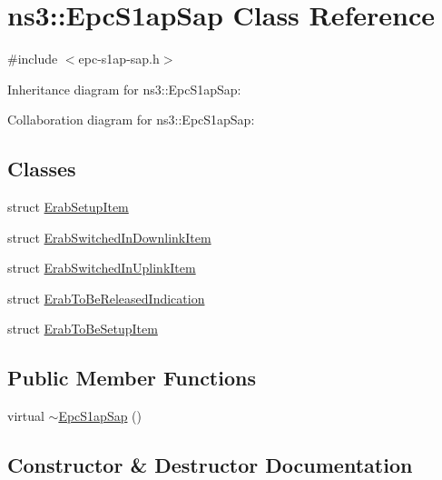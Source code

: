 \hypertarget{classns3_1_1EpcS1apSap}{}\section{ns3\+:\+:Epc\+S1ap\+Sap Class Reference}
\label{classns3_1_1EpcS1apSap}


{\ttfamily \#include $<$epc-\/s1ap-\/sap.\+h$>$}



Inheritance diagram for ns3\+:\+:Epc\+S1ap\+Sap\+:


Collaboration diagram for ns3\+:\+:Epc\+S1ap\+Sap\+:
\subsection*{Classes}
\begin{DoxyCompactItemize}
\item 
struct \hyperlink{structns3_1_1EpcS1apSap_1_1ErabSetupItem}{Erab\+Setup\+Item}
\item 
struct \hyperlink{structns3_1_1EpcS1apSap_1_1ErabSwitchedInDownlinkItem}{Erab\+Switched\+In\+Downlink\+Item}
\item 
struct \hyperlink{structns3_1_1EpcS1apSap_1_1ErabSwitchedInUplinkItem}{Erab\+Switched\+In\+Uplink\+Item}
\item 
struct \hyperlink{structns3_1_1EpcS1apSap_1_1ErabToBeReleasedIndication}{Erab\+To\+Be\+Released\+Indication}
\item 
struct \hyperlink{structns3_1_1EpcS1apSap_1_1ErabToBeSetupItem}{Erab\+To\+Be\+Setup\+Item}
\end{DoxyCompactItemize}
\subsection*{Public Member Functions}
\begin{DoxyCompactItemize}
\item 
virtual \hyperlink{classns3_1_1EpcS1apSap_a9d1f4686c28c8e12b12904d583592ae9}{$\sim$\+Epc\+S1ap\+Sap} ()
\end{DoxyCompactItemize}


\subsection{Constructor \& Destructor Documentation}
